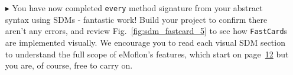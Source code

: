 \begin{itemize}
\vspace{0.5cm}

\item[$\blacktriangleright$] You have now completed \texttt{every} method signature from your abstract syntax using SDMs - fantastic work! Build your project to
confirm there aren't any errors, and review Fig.~\ref{fig:sdm_fastcard_5} to see how \texttt{FastCard}s are implemented visually. We encourage you to read each
visual SDM section to understand the full scope of eMoflon's features, which start on page~\hyperlink{page.12}{12} but you are, of course, free to carry on.
  
\end{itemize}
